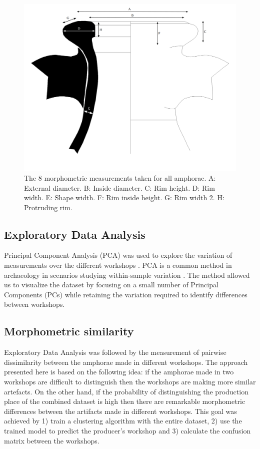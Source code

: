 \documentclass[review]{elsarticle}
\begin{document}
\begin{figure}[htp]
	\centering
\includegraphics[width=\linewidth]{figs/mesures.pdf}
\caption{The 8 morphometric measurements taken for all amphorae. A: External diameter. B: Inside diameter. C: Rim height. D: Rim width. E: Shape width. F: Rim inside height. G: Rim width 2. H: Protruding rim.}
\label{mesures}
\end{figure} 

\subsection{Exploratory Data Analysis}

Principal Component Analysis (PCA) was used to explore the variation of measurements over the different workshops \citep{jolliffe_principal_2002}. PCA is a common method in archaeology in scenarios studying within-sample variation \citep{shennan_quantifying_1997, li_crossbows_2014, schillinger_differences_2016}. The method allowed us to visualize the dataset by focusing on a small number of Principal Components (PCs) while retaining the variation required to identify differences between workshops. 

\subsection{Morphometric similarity} 

Exploratory Data Analysis was followed by the measurement of pairwise dissimilarity between the amphorae made in different workshops. The approach presented here is based on the following idea: if the amphorae made in two workshops are difficult to distinguish then the workshops are making more similar artefacts. On the other hand, if the probability of distinguishing the production place of the combined dataset is high then there are remarkable morphometric differences between the artifacts made in different workshops. This goal was achieved by 1) train a clustering algorithm with the entire dataset, 2) use the trained model to predict the producer's workshop and 3) calculate the confusion matrix between the workshops.
\end{document}
